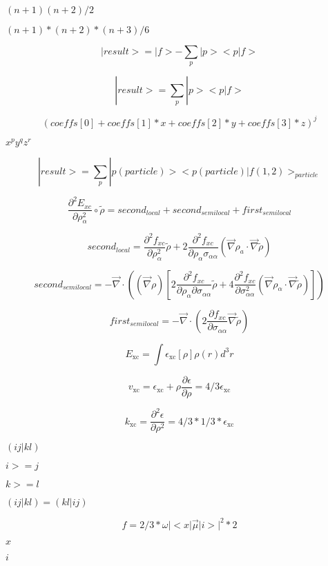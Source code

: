 \documentclass{article}
\begin{document}
$(n+1)(n+2)/2$
\pagebreak

$(n+1)*(n+2)*(n+3)/6$
\pagebreak

\[
  |result> = |f> - \sum_p |p><p|f>
\]
\pagebreak

\[
    | result > =  \sum_p | p > <p|f>
\]
\pagebreak

\[ (coeffs[0] + coeffs[1]*x + coeffs[2]*y + coeffs[3]*z)^j \]
\pagebreak

$x^p y^q z^r$
\pagebreak

\[
|result> = \sum_p |p(particle)> <p(particle)|f(1,2)>_{particle}
\]
\pagebreak

\[
  \frac{\partial^2E_{xc}}{\partial \rho_\alpha^2}\circ\tilde\rho
     = second_{local} + second_{semilocal} + first_{semilocal}
\]
\pagebreak

\[
       second_{local} = \frac{\partial^2 f_{xc}}{\partial \rho_\alpha^2}\tilde \rho
       + 2\frac{\partial^2 f_{xc}}{\partial \rho_\alpha\sigma_{\alpha\alpha}}
           \left(\vec\nabla \rho_a\cdot \vec \nabla\tilde\rho\right)
\]
\pagebreak

\[
     second_{semilocal} = -\vec\nabla\cdot\left((\vec\nabla\rho)
            \left[2\frac{\partial^2 f_{xc}}{\partial\rho_\alpha\partial\sigma_{\alpha\alpha}}\tilde\rho
            + 4\frac{\partial^2 f_{xc}}{\partial\sigma_{\alpha\alpha}^2}
               \left(\vec\nabla\rho_\alpha\cdot\vec\nabla\tilde\rho\right)\right]\right)
\]
\pagebreak

\[
     first_{semilocal} =
       -\vec\nabla\cdot\left(2\frac{\partial f_{xc}}{\partial\sigma_{\alpha\alpha}}\vec\nabla\tilde\rho\right)
\]
\pagebreak

\[
   E_\mathrm{xc} = \int\epsilon_\mathrm{xc}[\rho]\rho(r) d^3r
\]
\pagebreak

\[
   v_\mathrm{xc} = \epsilon_\mathrm{xc} + \rho\frac{\partial \epsilon}{\partial \rho}
                 = 4/3\epsilon_\mathrm{xc}
\]
\pagebreak

\[
   k_\mathrm{xc} = \frac{\partial^2\epsilon}{\partial \rho^2} = 4/3*1/3 * \epsilon_\mathrm{xc}
\]
\pagebreak

$(ij|kl)$
\pagebreak

$i>=j$
\pagebreak

$k>=l$
\pagebreak

$(ij|kl)=(kl|ij)$
\pagebreak

\[
f = 2/3 * \omega |<x | \vec \mu | i >| ^2 * 2
\]
\pagebreak

$ x $
\pagebreak

$ i $
\pagebreak
\end{document}
